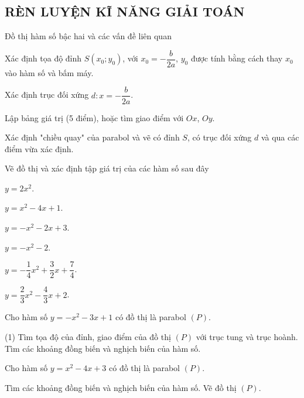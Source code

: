 \subsection{RÈN LUYỆN KĨ NĂNG GIẢI TOÁN}
\begin{dang}{Đồ thị hàm số bậc hai và các vấn đề liên quan}
	\begin{listEX}[1]
		\item [\ding{172}] Xác định tọa độ đỉnh $S(x_0;y_0)$, với $x_0=-\dfrac{b}{2a}$, $y_0$ được tính bằng cách thay $x_0$ vào hàm số và bấm máy.
		\item [\ding{173}] Xác định trục đối xứng $d \colon x=-\dfrac{b}{2a}$.
		\item [\ding{174}] Lập bảng giá trị (5 điểm), hoặc tìm giao điểm với $Ox$, $Oy$.
		\item [\ding{175}] Xác định "chiều quay" của parabol và vẽ  có đỉnh $S$, có trục đối xứng $d$ và qua các điểm vừa xác định. 
	\end{listEX}
\end{dang}

\begin{vd}
	Vẽ đồ thị và xác định tập giá trị của các hàm số sau đây
	\begin{listEX}[3]
		\item $y=2x^2$.
		\item $y=x^2-4x+1$.
		\item $y=-x^2-2x+3$.
		\item $y=-x^2-2$.
		\item $y=-\dfrac{1}{4}x^2+\dfrac{3}{2}x+\dfrac{7}{4}$.
		\item $y=\dfrac{2}{3}x^2-\dfrac{4}{3}x+2$.
	\end{listEX}
	\loigiai{}
\end{vd}
\begin{vd}%
	Cho hàm số $y=-x^2-3x+1$ có đồ thị là parabol $(P)$. 
	\begin{tasks}(1)
		\task Tìm tọa độ của đỉnh, giao điểm của đồ thị $(P)$ với trục tung và trục hoành.
		\task Tìm các khoảng đồng biến và nghịch biến của hàm số.
	\end{tasks}
		\loigiai{}
\end{vd}
\begin{vd}%
	Cho hàm số $y=x^2-4x+3$ có đồ thị là parabol $(P)$. 
	\begin{tasks}
		\task Tìm các khoảng đồng biến và nghịch biến của hàm số. 
		\task Vẽ đồ thị $(P)$.
	\end{tasks}
	\loigiai{}
\end{vd}

